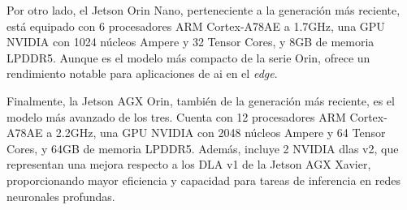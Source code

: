 \documentclass[11pt,spanish,listoffigures,listoftables]{tfgetsinf}
\begin{document}
Por otro lado, el Jetson Orin Nano, perteneciente a la generación más reciente, está equipado con 6 procesadores ARM Cortex-A78AE a 1.7GHz, una GPU NVIDIA con 1024 núcleos Ampere y 32 Tensor Cores, y 8GB de memoria LPDDR5. Aunque es el modelo más compacto de la serie Orin, ofrece un rendimiento notable para aplicaciones de \gls{ai} en el \textit{edge}.

Finalmente, la Jetson AGX Orin, también de la generación más reciente, es el modelo más avanzado de los tres. Cuenta con 12 procesadores ARM Cortex-A78AE a 2.2GHz, una GPU NVIDIA con 2048 núcleos Ampere y 64 Tensor Cores, y 64GB de memoria LPDDR5. Además, incluye 2 NVIDIA \glspl{dla} v2, que representan una mejora respecto a los DLA v1 de la Jetson AGX Xavier, proporcionando mayor eficiencia y capacidad para tareas de inferencia en redes neuronales profundas.
\end{document}
